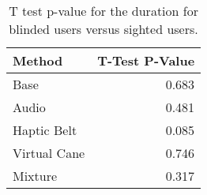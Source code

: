 
\begin{table}[!htb]
\centering
\caption{T test p-value for the duration for blinded users versus sighted users.}
\label{tab:ttest_duration}
\begin{tabular}{lr}
\toprule
      Method &  T-Test P-Value \\
\midrule
        Base &           0.683 \\
       Audio &           0.481 \\
 Haptic Belt &           0.085 \\
Virtual Cane &           0.746 \\
     Mixture &           0.317 \\
\bottomrule
\end{tabular}
\end{table}


